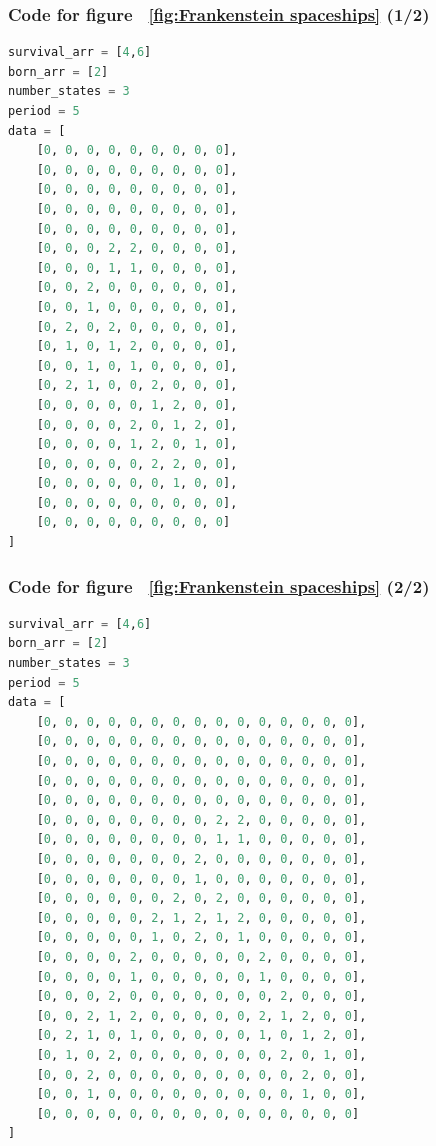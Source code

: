 \documentclass[12pt]{article}
\numberwithin{figure}{section} %
\begin{document}
\subsubsection{Code for figure ~\ref{fig:Frankenstein spaceships} (1/2)}
\label{subsubsection:Frankenstein spaceship one}
\begin{lstlisting}[language = Python]
survival_arr = [4,6]
born_arr = [2]
number_states = 3
period = 5
data = [
    [0, 0, 0, 0, 0, 0, 0, 0, 0],
    [0, 0, 0, 0, 0, 0, 0, 0, 0],
    [0, 0, 0, 0, 0, 0, 0, 0, 0],
    [0, 0, 0, 0, 0, 0, 0, 0, 0],
    [0, 0, 0, 0, 0, 0, 0, 0, 0],
    [0, 0, 0, 2, 2, 0, 0, 0, 0],
    [0, 0, 0, 1, 1, 0, 0, 0, 0],
    [0, 0, 2, 0, 0, 0, 0, 0, 0],
    [0, 0, 1, 0, 0, 0, 0, 0, 0],
    [0, 2, 0, 2, 0, 0, 0, 0, 0],
    [0, 1, 0, 1, 2, 0, 0, 0, 0],
    [0, 0, 1, 0, 1, 0, 0, 0, 0],
    [0, 2, 1, 0, 0, 2, 0, 0, 0],
    [0, 0, 0, 0, 0, 1, 2, 0, 0],
    [0, 0, 0, 0, 2, 0, 1, 2, 0],
    [0, 0, 0, 0, 1, 2, 0, 1, 0],
    [0, 0, 0, 0, 0, 2, 2, 0, 0],
    [0, 0, 0, 0, 0, 0, 1, 0, 0],
    [0, 0, 0, 0, 0, 0, 0, 0, 0],
    [0, 0, 0, 0, 0, 0, 0, 0, 0]
]
\end{lstlisting}

\subsubsection{Code for figure ~\ref{fig:Frankenstein spaceships} (2/2)}
\label{subsubsection:Frankenstein spaceship two}
\begin{lstlisting}[language = Python]
survival_arr = [4,6]
born_arr = [2]
number_states = 3
period = 5
data = [
    [0, 0, 0, 0, 0, 0, 0, 0, 0, 0, 0, 0, 0, 0, 0],
    [0, 0, 0, 0, 0, 0, 0, 0, 0, 0, 0, 0, 0, 0, 0],
    [0, 0, 0, 0, 0, 0, 0, 0, 0, 0, 0, 0, 0, 0, 0],
    [0, 0, 0, 0, 0, 0, 0, 0, 0, 0, 0, 0, 0, 0, 0],
    [0, 0, 0, 0, 0, 0, 0, 0, 0, 0, 0, 0, 0, 0, 0],
    [0, 0, 0, 0, 0, 0, 0, 0, 2, 2, 0, 0, 0, 0, 0],
    [0, 0, 0, 0, 0, 0, 0, 0, 1, 1, 0, 0, 0, 0, 0],
    [0, 0, 0, 0, 0, 0, 0, 2, 0, 0, 0, 0, 0, 0, 0],
    [0, 0, 0, 0, 0, 0, 0, 1, 0, 0, 0, 0, 0, 0, 0],
    [0, 0, 0, 0, 0, 0, 2, 0, 2, 0, 0, 0, 0, 0, 0],
    [0, 0, 0, 0, 0, 2, 1, 2, 1, 2, 0, 0, 0, 0, 0],
    [0, 0, 0, 0, 0, 1, 0, 2, 0, 1, 0, 0, 0, 0, 0],
    [0, 0, 0, 0, 2, 0, 0, 0, 0, 0, 2, 0, 0, 0, 0],
    [0, 0, 0, 0, 1, 0, 0, 0, 0, 0, 1, 0, 0, 0, 0],
    [0, 0, 0, 2, 0, 0, 0, 0, 0, 0, 0, 2, 0, 0, 0],
    [0, 0, 2, 1, 2, 0, 0, 0, 0, 0, 2, 1, 2, 0, 0],
    [0, 2, 1, 0, 1, 0, 0, 0, 0, 0, 1, 0, 1, 2, 0],
    [0, 1, 0, 2, 0, 0, 0, 0, 0, 0, 0, 2, 0, 1, 0],
    [0, 0, 2, 0, 0, 0, 0, 0, 0, 0, 0, 0, 2, 0, 0],
    [0, 0, 1, 0, 0, 0, 0, 0, 0, 0, 0, 0, 1, 0, 0],
    [0, 0, 0, 0, 0, 0, 0, 0, 0, 0, 0, 0, 0, 0, 0]
]
\end{lstlisting}
\end{document}
